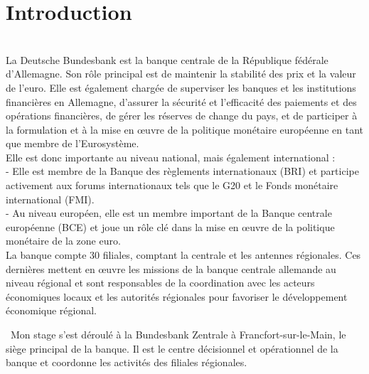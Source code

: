 \section*{Introduction} 
{}
\thispagestyle{noTitledHeader}
~\\
La Deutsche Bundesbank est la banque centrale de la République fédérale d'Allemagne. 
Son rôle principal est de maintenir la stabilité des prix et la valeur de l'euro. 
Elle est également chargée de superviser les banques et les institutions financières en Allemagne, 
d'assurer la sécurité et l'efficacité des paiements et des opérations financières, 
de gérer les réserves de change du pays, 
et de participer à la formulation et à la mise en œuvre de la politique monétaire européenne en tant que membre de l'Eurosystème.
\\
Elle est donc importante au niveau national, mais également international : 
\\
- Elle est membre de la Banque des règlements internationaux (BRI) et participe activement aux forums internationaux tels que le G20 et le Fonds monétaire international (FMI). 
\\
- Au niveau européen, elle est un membre important de la Banque centrale européenne (BCE) et joue un rôle clé dans la mise en œuvre de la politique monétaire de la zone euro. 
\\

La banque compte 30 filiales, comptant la centrale et les antennes régionales.
Ces dernières mettent en œuvre les missions de la banque centrale allemande au niveau régional et sont responsables de la coordination avec les acteurs économiques locaux et les autorités régionales pour favoriser le développement économique régional.

~Mon stage s'est déroulé à la Bundesbank Zentrale à Francfort-sur-le-Main, le siège principal de la banque. 
Il est le centre décisionnel et opérationnel de la banque et coordonne les activités des filiales régionales.
\\


